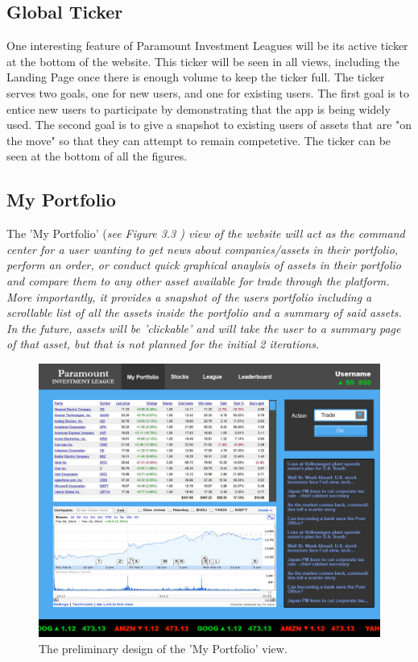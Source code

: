 \subsection{Global Ticker}

One interesting feature of Paramount Investment Leagues will be its active ticker at the
bottom of the website.  This ticker will be seen in all views, including the Landing Page
once there is enough volume to keep the ticker full.  The ticker serves two goals, one for
new users, and one for existing users.  The first goal is to entice new users to
participate by demonstrating that the app is being widely used. The second goal is to give
a snapshot to existing users of assets that are "on the move" so that they can attempt to
remain competetive. The ticker can be seen at the bottom of all the figures.\\

\subsection{My Portfolio}

The 'My Portfolio' (\em see Figure 3.3 \em) view of the  website will act as the command
center for a user wanting to get news about companies/assets in their portfolio, perform
an order, or conduct quick graphical anaylsis of assets in their portfolio and compare
them to any other asset available for trade through the platform.\\

More importantly, it provides a snapshot of the users portfolio including a scrollable list
of all the assets inside the portfolio and a summary of said assets.  In the future, assets
will be 'clickable' and will take the user to a summary page of that asset, but that is not
planned for the initial 2 iterations.\\

\begin{figure}
\centering
\includegraphics[width=5.5in]{./img/mock/portfolio.jpg}
\caption{The preliminary design of the 'My Portfolio' view.}
\end{figure}

